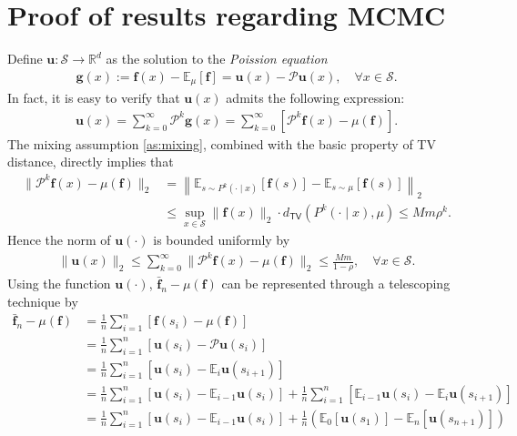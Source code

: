 \section{Proof of results regarding MCMC}\label{app:proof-MCMC}
Define $\bm{u}: \mathcal{S} \to \mathbb{R}^d$ as the solution to the \emph{Poission equation}
\begin{align*}
\bm{g}(x) := \bm{f}(x) - \mathbb{E}_{\mu}[\bm{f}] = \bm{u}(x) - \mathcal{P}\bm{u}(x), \quad \forall x \in \mathcal{S}.
\end{align*}
In fact, it is easy to verify that $\bm{u}(x)$ admits the following expression:
\begin{align*}
\bm{u}(x) = \sum_{k=0}^{\infty} \mathcal{P}^k \bm{g}(x) = \sum_{k=0}^{\infty} [\mathcal{P}^k \bm{f}(x)-\mu(\bm{f})].
\end{align*}
The mixing assumption \ref{as:mixing}, combined with the basic property of TV distance, directly implies that
\begin{align*}
\|\mathcal{P}^k \bm{f}(x) - \mu(\bm{f})\|_2   
&= \left\|\mathbb{E}_{s \sim P^k(\cdot \mid x)}[\bm{f}(s)] - \mathbb{E}_{s \sim \mu}[\bm{f}(s)]\right\|_2 \\ 
&\leq \sup_{x \in \mathcal{S}}\|\bm{f}(x)\|_2\cdot d_{\mathsf{TV}}(P^k(\cdot \mid x),\mu) \leq Mm\rho^k.
\end{align*}
Hence the norm of $\bm{u}(\cdot)$ is bounded uniformly by
\begin{align}\label{eq:MCMC-u-bound}
\|\bm{u}(x)\|_2 \leq \sum_{k=0}^{\infty} \|\mathcal{P}^k \bm{f}(x)-\mu(\bm{f})\|_2 \leq \frac{Mm}{1-\rho}, \quad \forall x \in \mathcal{S}.
\end{align}
Using the function $\bm{u}(\cdot)$, $\bar{\bm{f}}_n -\mu(\bm{f})$ can be represented through a telescoping technique by
\begin{align}\label{eq:MCMC-decompose}
\bar{\bm{f}}_n - \mu(\bm{f}) &= \frac{1}{n} \sum_{i=1}^n [\bm{f}(s_i) - \mu(\bm{f})] \nonumber \\ 
&=  \frac{1}{n} \sum_{i=1}^n[\bm{u}(s_i) - \mathcal{P}\bm{u}(s_i)] \nonumber \\ 
&= \frac{1}{n} \sum_{i=1}^n[\bm{u}(s_i) - \mathbb{E}_{i}\bm{u}(s_{i+1})] \nonumber \\ 
&= \frac{1}{n} \sum_{i=1}^n[\bm{u}(s_i) - \mathbb{E}_{i-1}\bm{u}(s_{i})] + \frac{1}{n} \sum_{i=1}^n[\mathbb{E}_{i-1}\bm{u}(s_{i})-\mathbb{E}_{i}\bm{u}(s_{i+1})]\nonumber \\
&= \frac{1}{n} \sum_{i=1}^n[\bm{u}(s_i) - \mathbb{E}_{i-1}\bm{u}(s_{i})] + \frac{1}{n} \left(\mathbb{E}_0[\bm{u}(s_1)] - \mathbb{E}_n[\bm{u}(s_{n+1})]\right)
\end{align}
